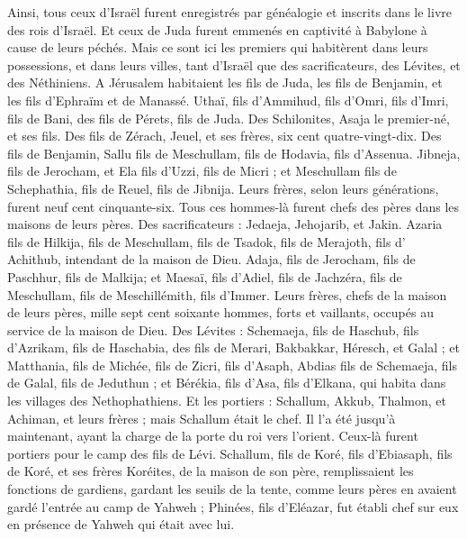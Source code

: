\begin{multicols}{2}
\VerseOne{}Ainsi, tous ceux d'Israël furent enregistrés par généalogie et inscrits dans le livre des rois d'Israël. Et ceux de Juda furent emmenés en captivité à Babylone à cause de leurs péchés.
Mais ce sont ici les premiers qui habitèrent dans leurs possessions, et dans leurs villes, tant d'Israël que des sacrificateurs, des Lévites, et des Néthiniens.
A Jérusalem habitaient les fils de Juda, les fils de Benjamin, et les fils d'Ephraïm et de Manassé.
Uthaï, fils d'Ammihud, fils d'Omri, fils d'Imri, fils de Bani, des fils de Pérets, fils de Juda.
Des Schilonites, Asaja le premier-né, et ses fils.
Des fils de Zérach, Jeuel, et ses frères, six cent quatre-vingt-dix.
Des fils de Benjamin, Sallu fils de Meschullam, fils de Hodavia, fils d'Assenua.
Jibneja, fils de Jerocham, et Ela fils d’Uzzi, fils de Micri ; et Meschullam fils de Schephathia, fils de Reuel, fils de Jibnija.
Leurs frères, selon leurs générations, furent neuf cent cinquante-six. Tous ces hommes-là furent chefs des pères dans les maisons de leurs  pères.
Des sacrificateurs : Jedaeja, Jehojarib, et Jakin.
Azaria fils de Hilkija, fils de Meschullam, fils de Tsadok, fils de Merajoth, fils d' Achithub, intendant de la maison de Dieu.
Adaja, fils de Jerocham, fils de Paschhur, fils de Malkija; et Maesaï, fils d'Adiel, fils de Jachzéra, fils de Meschullam, fils de Meschillémith, fils d'Immer.
Leurs frères, chefs de la maison de leurs pères, mille sept cent soixante hommes, forts et vaillants, occupés au service de la maison de Dieu.
Des Lévites : Schemaeja, fils de Haschub, fils d'Azrikam, fils de Haschabia, des fils de Merari,
Bakbakkar, Héresch, et Galal ; et Matthania, fils de Michée, fils de Zicri, fils d'Asaph,
Abdias fils de Schemaeja, fils de Galal, fils de Jeduthun ; et Bérékia, fils d'Asa, fils d'Elkana, qui habita dans les villages des Nethophathiens.
Et les portiers : Schallum, Akkub, Thalmon, et Achiman, et leurs frères ; mais Schallum était le chef.
Il l'a été jusqu'à maintenant, ayant la charge de la porte du roi vers l’orient. Ceux-là furent portiers pour le camp des fils de Lévi.
Schallum, fils de Koré, fils d'Ebiasaph, fils de Koré, et ses frères Koréites, de la maison de son père, remplissaient les fonctions de gardiens, gardant les seuils de la tente, comme leurs pères en avaient gardé l'entrée au camp de Yahweh ;
Phinées, fils d'Eléazar, fut établi chef sur eux en présence de Yahweh qui était avec lui.

\end{multicols}

